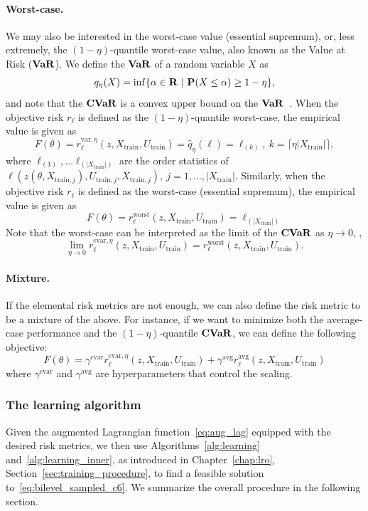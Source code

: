 \paragraph{Worst-case.} We may also be interested in the worst-case value (essential supremum), or, less extremely, the $(1-\eta)$-quantile worst-case value, also known as the Value at Risk ($\bf{VaR}$). We define the $\bf{VaR}$ of a random variable $X$ as $$q_\eta(X) = \inf\{\alpha \in {\mathbf R} ~|~ {\mathbf P}(X \leq \alpha) \geq 1-\eta \},$$
and note that the $\mathop{\bf CVaR}$ is a convex upper bound on the $\bf{VaR}$~\cite{cvaropt}.
When the objective risk $r_\ell$ is defined as the $(1-\eta)$-quantile worst-case, the empirical value is given as 
$$F(\theta) = r^{\text{var},\eta}_\ell(z,X_{\text{train}},U_{\text{train}}) = \hat{q}_\eta(\ell) =\ell_{(k)}, ~k = \lceil\eta|X_{\text{train}}|\rceil,$$
where $\ell_{(1)},\dots \ell_{(|X_{\text{train}}|)}$ are the order statistics of $\ell(z(\theta,X_{\text{train},j}),U_{\text{train},j}, X_{\text{train},j}),~j=1,\dots,|X_{\text{train}}|$.
Similarly, when the objective risk $r_\ell$ is defined as the worst-case (essential supremum), the empirical value is given as
$$F(\theta) = r^{\text{worst}}_\ell(z,X_{\text{train}},U_{\text{train}}) = \ell_{(|X_{\text{train}}|)}$$
Note that the worst-case can be interpreted as the limit of the $\mathop{\bf CVaR}$ as $\eta \to 0$, \ie,
$$\lim_{\eta \to 0} r^{\text{cvar},\eta}_\ell(z,X_{\text{train}},U_{\text{train}}) = r^{\text{worst}}_\ell(z,X_{\text{train}},U_{\text{train}}).$$

\paragraph{Mixture.} If the elemental risk metrics are not enough, we can also define the risk metric to be a mixture of the above. For instance, if we want to minimize both the average-case performance and the $(1-\eta)$-quantile $\mathop{\bf CVaR}$, we can define the following objective:
\begin{equation}
  \label{eq:default_sim}
  F(\theta) =  \gamma^{\text{cvar}}r^{\text{cvar},\eta}_\ell(z,X_{\text{train}},U_{\text{train}}) + \gamma^{\text{avg}}r^{\text{avg}}_\ell(z,X_{\text{train}},U_{\text{train}})
\end{equation}
where $\gamma^{\text{cvar}}$ and $\gamma^{\text{avg}}$ are hyperparameters that control the scaling.
\subsubsection{The learning algorithm}
Given the augmented Lagrangian function~\eqref{eq:aug_lag} equipped with the desired risk metrics, we then use Algorithms~\ref{alg:learning} and~\ref{alg:learning_inner}, as introduced in Chapter~\ref{chap:lro}, Section~\ref{sec:training_procedure}, to find a feasible solution to~\eqref{eq:bilevel_sampled_c6}. 
We summarize the overall procedure in the following section.


